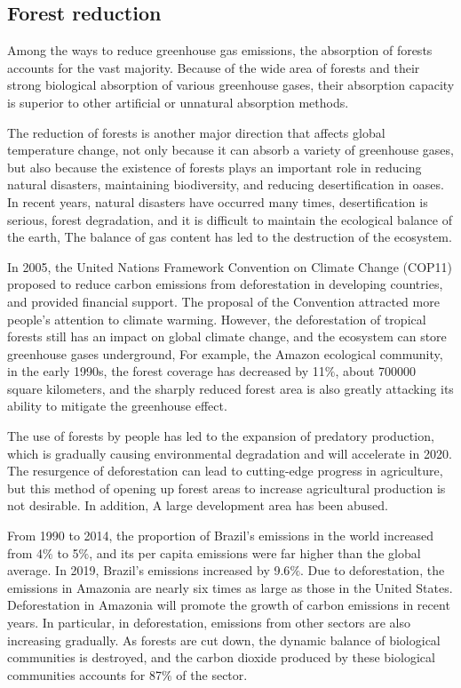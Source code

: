 \documentclass{apmcmthesis}
\begin{document}
\subsection{Forest reduction}
Among the ways to reduce greenhouse gas emissions, the absorption of forests accounts for the vast majority. Because of the wide area of forests and their strong biological absorption of various greenhouse gases, their absorption capacity is superior to other artificial or unnatural absorption methods.

The reduction of forests is another major direction that affects global temperature change, not only because it can absorb a variety of greenhouse gases, but also because the existence of forests plays an important role in reducing natural disasters, maintaining biodiversity, and reducing desertification in oases. In recent years, natural disasters have occurred many times, desertification is serious, forest degradation, and it is difficult to maintain the ecological balance of the earth, The balance of gas content has led to the destruction of the ecosystem.

In 2005, the United Nations Framework Convention on Climate Change (COP11) proposed to reduce carbon emissions from deforestation in developing countries, and provided financial support. The proposal of the Convention attracted more people's attention to climate warming. However, the deforestation of tropical forests still has an impact on global climate change, and the ecosystem can store greenhouse gases underground, For example, the Amazon ecological community, in the early 1990s, the forest coverage has decreased by 11$\%$, about 700000 square kilometers, and the sharply reduced forest area is also greatly attacking its ability to mitigate the greenhouse effect.

The use of forests by people has led to the expansion of predatory production, which is gradually causing environmental degradation and will accelerate in 2020. The resurgence of deforestation can lead to cutting-edge progress in agriculture, but this method of opening up forest areas to increase agricultural production is not desirable. In addition, A large development area has been abused.

From 1990 to 2014, the proportion of Brazil's emissions in the world increased from 4$\%$ to 5$\%$, and its per capita emissions were far higher than the global average. In 2019, Brazil's emissions increased by 9.6$\%$. Due to deforestation, the emissions in Amazonia are nearly six times as large as those in the United States. Deforestation in Amazonia will promote the growth of carbon emissions in recent years. In particular, in deforestation, emissions from other sectors are also increasing gradually. As forests are cut down, the dynamic balance of biological communities is destroyed, and the carbon dioxide produced by these biological communities accounts for 87$\%$ of the sector.
\end{document}
